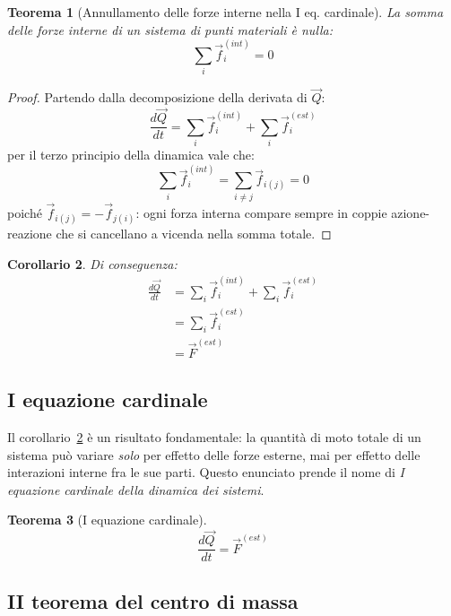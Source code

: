 \documentclass[11pt, a4paper, openright]{book}
\theoremstyle{plain}
\newtheorem{theorem}{Teorema}[section]
\newtheorem{corollario}[theorem]{Corollario}
\theoremstyle{definition}
\begin{document}
\begin{theorem}[Annullamento delle forze interne nella I eq. cardinale]
\label{thm:annullamento-forze-interne-Q}
La somma delle forze interne di un sistema di punti materiali è nulla:
\[\sum_i \vec{f}_i^{(int)} = 0\]
\end{theorem}

\begin{proof}
Partendo dalla decomposizione della derivata di $\vec{Q}$:
\[\frac{d\vec{Q}}{dt} = \sum_i \vec{f}_i^{(int)} + \sum_i \vec{f}_i^{(est)}\]
per il terzo principio della dinamica vale che:
\[\sum_i \vec{f}_i^{(int)} = \sum_{i \not = j} \vec{f}_{i(j)} = 0\]
poiché $\vec{f}_{i(j)} = - \vec{f}_{j(i)}$: ogni forza interna compare
sempre in coppie azione-reazione che si cancellano a vicenda nella
somma totale.
\end{proof}

\begin{corollario}
\label{cor:dQdt-solo-esterne}
Di conseguenza:
\begin{align}
    \frac{d\vec{Q}}{dt} & = \sum_i \vec{f}_i^{(int)} + \sum_i \vec{f}_i^{(est)}  \\
    & = \sum_i \vec{f}_i^{(est)} \\
    & = \vec{F}^{(est)}
\end{align}
\end{corollario}

\subsection{I equazione cardinale}
\label{subsec:I-cardinale}

Il corollario~\ref{cor:dQdt-solo-esterne} è un risultato fondamentale:
la quantità di moto totale di un sistema può variare \emph{solo} per
effetto delle forze esterne, mai per effetto delle interazioni interne
fra le sue parti. Questo enunciato prende il nome di \emph{I equazione
cardinale della dinamica dei sistemi}.

\begin{theorem}[I equazione cardinale]
\label{thm:I-cardinale}
\begin{equation}
    \frac{d\vec{Q}}{dt} = \vec{F}^{(est)}
\end{equation}
\end{theorem}

\subsection{II teorema del centro di massa}
\label{subsec:II-centro-massa}
\end{document}

